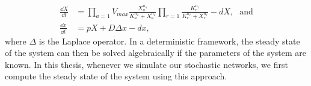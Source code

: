 \begin{align}
  \frac{\dd X}{\dd t} &= 
  \prod_{a=1} V_{max}\frac{X_a^{n_{a}}}{K_a^{n_a} + X_a^{n_a}}
  \prod_{r=1} \frac{K_r^{n_{r}}}{K_r^{n_r} + X_r^{n_r}} -
  dX, \ \ \ \text{and} \\
  \frac{\dd x}{\dd t} &= pX + D\Delta x - dx,
  \label{eq:gene_expr_reg}
\end{align}
where $\Delta$ is the Laplace operator. In a deterministic framework, the steady
state of the system can then be solved algebraically if the
parameters of the system are known. In this thesis, whenever we simulate our
stochastic networks, we first compute the steady state of the system using this approach.
